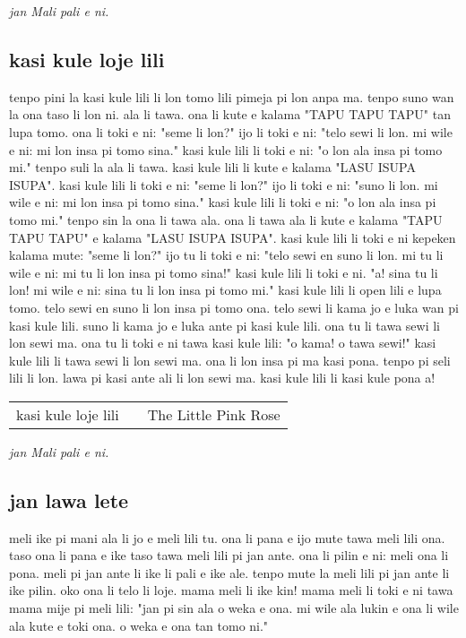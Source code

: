 \textit{jan Mali pali e ni. \cite{www:astrodonunt:01}}

\subsection{kasi kule loje lili}

tenpo pini la kasi kule lili li lon tomo lili pimeja pi lon anpa ma. 
tenpo suno wan la ona taso li lon ni. 
ala li tawa. 
ona li kute e kalama "TAPU TAPU TAPU" tan lupa tomo.
ona li toki e ni: "seme li lon?"
ijo li toki e ni: "telo sewi li lon. 
mi wile e ni: mi lon insa pi tomo sina."
kasi kule lili li toki e ni: "o lon ala insa pi tomo mi."
tenpo suli la ala li tawa. 
kasi kule lili li kute e kalama "LASU ISUPA ISUPA".
kasi kule lili li toki e ni: "seme li lon?"
ijo li toki e ni: "suno li lon. 
mi wile e ni: mi lon insa pi tomo sina."
kasi kule lili li toki e ni: "o lon ala insa pi tomo mi." 
tenpo sin la ona li tawa ala.
ona li tawa ala li kute e kalama "TAPU TAPU TAPU" e kalama "LASU ISUPA ISUPA".
kasi kule lili li toki e ni kepeken kalama mute: "seme li lon?"
ijo tu li toki e ni: "telo sewi en suno li lon. 
mi tu li wile e ni: mi tu li lon insa pi tomo sina!"
kasi kule lili li toki e ni.
"a! 
sina tu li lon! 
mi wile e ni: sina tu li lon insa pi tomo mi."
kasi kule lili li open lili e lupa tomo. 
telo sewi en suno li lon insa pi tomo ona. 
telo sewi li kama jo e luka wan pi kasi kule lili. 
suno li kama jo e luka ante pi kasi kule lili. 
ona tu li tawa sewi li lon sewi ma. 
ona tu li toki e ni tawa kasi kule lili: "o kama! 
o tawa sewi!"
kasi kule lili li tawa sewi li lon sewi ma. 
ona li lon insa pi ma kasi pona. 
tenpo pi seli lili li lon. 
lawa pi kasi ante ali li lon sewi ma. 
kasi kule lili li kasi kule pona a!

\begin{supertabular}{p{5,5cm}|ll}
kasi kule loje lili  && The Little Pink Rose \\
\end{supertabular}

\textit{jan Mali pali e ni. \cite{www:astrodonunt:01}}
%
\newpage
\subsection{jan lawa lete}

meli ike pi mani ala li jo e meli lili tu. 
ona li pana e ijo mute tawa meli lili ona. 
taso ona li pana e ike taso tawa meli lili pi jan ante. 
ona li pilin e ni: meli ona li pona. 
meli pi jan ante li ike li pali e ike ale. 
tenpo mute la meli lili pi jan ante li ike pilin. 
oko ona li telo li loje.  
mama meli li ike kin! 
mama meli li toki e ni tawa mama mije pi meli lili: 
"jan pi sin ala o weka e ona. 
mi wile ala lukin e ona li wile ala kute e toki ona. 
o weka e ona tan tomo ni."

